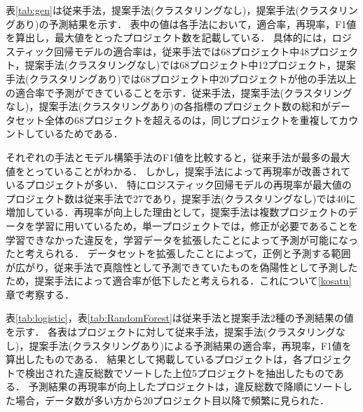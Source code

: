 \documentclass[submit,noauthor,ses,dvipdfmx]{ipsj}
\begin{document}
表\ref{tab:gen}は従来手法，提案手法(クラスタリングなし)，提案手法(クラスタリングあり)の予測結果を示す．
表中の値は各手法において，適合率，再現率，F1値を算出し，最大値をとったプロジェクト数を記載している．
具体的には，ロジスティック回帰モデルの適合率は，従来手法では68プロジェクト中48プロジェクト，提案手法(クラスタリングなし)では68プロジェクト中12プロジェクト，提案手法(クラスタリングあり)では68プロジェクト中20プロジェクトが他の手法以上の適合率で予測ができていることを示す．従来手法，提案手法(クラスタリングなし)，提案手法(クラスタリングあり)の各指標のプロジェクト数の総和がデータセット全体の68プロジェクトを超えるのは，同じプロジェクトを重複してカウントしているためである．

それぞれの手法とモデル構築手法のF1値を比較すると，従来手法が最多の最大値をとっていることがわかる．
しかし，提案手法によって再現率が改善されているプロジェクトが多い．
特にロジスティック回帰モデルの再現率が最大値のプロジェクト数は従来手法で27であり，提案手法(クラスタリングなし)では40に増加している．再現率が向上した理由として，提案手法は複数プロジェクトのデータを学習に用いているため，単一プロジェクトでは，修正が必要であることを学習できなかった違反を，学習データを拡張したことによって予測が可能になったと考えられる．
データセットを拡張したことによって，正例と予測する範囲が広がり，従来手法で真陰性として予測できていたものを偽陽性として予測したため，提案手法によって適合率が低下したと考えられる．これについて\ref{kosatu}章で考察する．

表\ref{tab:logistic}，表\ref{tab:RandomForest}は従来手法と提案手法2種の予測結果の値を示す．
各表はプロジェクトに対して従来手法，提案手法(クラスタリングなし)，提案手法(クラスタリングあり)による予測結果の適合率，再現率，F1値を算出したものである．
結果として掲載しているプロジェクトは，各プロジェクトで検出された違反総数でソートした上位5プロジェクトを抽出したものである．
予測結果の再現率が向上したプロジェクトは，違反総数で降順にソートした場合，データ数が多い方から20プロジェクト目以降で頻繁に見られた．
\end{document}
